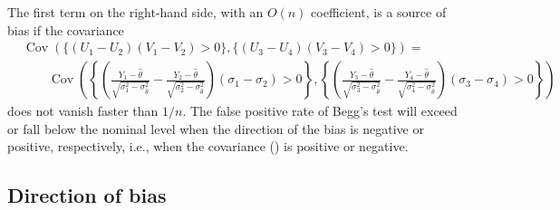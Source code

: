 \documentclass[12pt]{article}
\renewcommand{\P}{P}
\newcommand{\y}{Y}
\renewcommand{\u}{U}
\renewcommand{\v}{V}
\newcommand{\thetahat}{\hat{\theta}}
\newcommand{\h}[2]{\{(\u_{#1}-\u_{#2})(\v_{#1}-\v_{#2})>0\}}
\DeclareMathOperator{\Cov}{Cov}
\begin{document}
    The first term on the right-hand side, with an $O(n)$ coefficient, is a
    source of bias if the covariance
    \begin{align}
      &\Cov(\h{1}{2},\h{3}{4})=\\ 
      &\hspace{2em}\Cov\left(\left\{\left(\frac{\y_1-\thetahat}{\sqrt{\sigma_1^2-\sigma_{\thetahat}^2}}
        -\frac{\y_2-\thetahat}{\sqrt{\sigma_2^2-\sigma_{\thetahat}^2}}\right)(\sigma_1-\sigma_2)>0\right\} ,
       \left\{\left(\frac{\y_3-\thetahat}{\sqrt{\sigma_3^2-\sigma_{\thetahat}^2}}-\frac{\y_4-\thetahat}{\sqrt{\sigma_4^2-\sigma_{\thetahat}^2}}\right)(\sigma_3-\sigma_4)>0\right\}\right)
        \label{eqn:cov_bias_source}
    \end{align}
    does not vanish faster than $1/n$. The false positive rate of
    Begg's test will exceed or fall below the nominal level when the
    direction of the bias is negative or positive, respectively, i.e., when the covariance () is positive or negative.

    \subsection{Direction of bias}
    \label{section:theory:direction}
\end{document}
